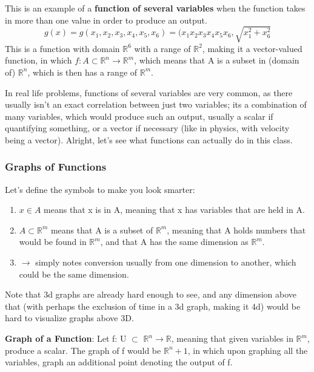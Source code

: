 \documentclass{article}
\begin{document}
This is an example of a \textbf{function of several variables} when the function
takes in more than one value in order to produce an output.
\[
  g(x) = g(x_1,x_2,x_3,x_4,x_5,x_6) = (x_1x_2x_3x_4x_5x_6, \sqrt{x_1^2 + x_6^2}
\]
This is a function with domain $\mathbb{R}^6$ with a range of $\mathbb{R}^2$, making it
a vector-valued function, in which $f: A \subset \mathbb{R}^n \rightarrow \mathbb{R}^m$,
which means that A is a subset in (domain of) $\mathbb{R}^n$, which is then
has a range of $\mathbb{R}^m$.\newline

In real life problems, functions of several variables are very common, as there
usually isn't an exact correlation between just two variables; its a combination
of many variables, which would produce such an output, usually a scalar if quantifying
something, or a vector if necessary (like in physics, with velocity being a vector).
\newpage
Alright, let's see what functions can actually do in this class.
\subsubsection{Graphs of Functions}
Let's define the symbols to make you look smarter:
\begin{enumerate}
    \item $x \in A$ means that x is in A, meaning that x has variables that are held in A.
    \item $A \subset \mathbb{R}^m$ means that A is a subset of $\mathbb{R}^m$, meaning that
      A holds numbers that would be found in $\mathbb{R}^m$, and that A has the same
      dimension as $\mathbb{R}^m$.
    \item $\rightarrow$ simply notes conversion usually from one dimension to another, which
      could be the same dimension.
\end{enumerate}

Note that 3d graphs are already hard enough to see, and any dimension above that
(with perhaps the exclusion of time in a 3d graph, making it 4d) would be hard to visualize
graphs above 3D.\newline

\textbf{Graph of a Function}:
Let f: U $\subset$ $\mathbb{R}^n \rightarrow \mathbb{R}$, meaning that given variables in $\mathbb{R}^m$,
produce a scalar. The graph of f would be $\mathbb{R}^n+1$, in which upon graphing all the variables,
graph an additional point denoting the output of f.\newline
\end{document}
